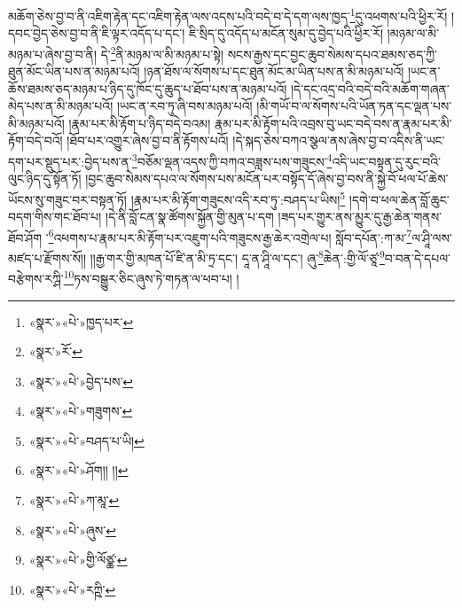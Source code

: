 མཆོག་ཅེས་བྱ་བ་ནི་འཇིག་རྟེན་དང་འཇིག་རྟེན་ལས་འདས་པའི་བདེ་བ་དེ་དག་ལས་ཁྱད་\footnote{«སྣར་»«པེ་»ཁྱད་པར་}དུ་འཕགས་པའི་ཕྱིར་རོ། །དབང་བྱེད་ཅེས་བྱ་བ་ནི་ཇི་ལྟར་འདོད་པ་དང་། ཇི་སྲིད་དུ་འདོད་པ་མངོན་སུམ་དུ་བྱེད་པའི་ཕྱིར་རོ། །མཉམ་ལ་མི་མཉམ་པ་ཞེས་བྱ་བ་ནི། དེ་\footnote{«སྣར་»རོ་}ནི་མཉམ་ལ་མི་མཉམ་པ་སྟེ། སངས་རྒྱས་དང་བྱང་ཆུབ་སེམས་དཔའ་ཐམས་ཅད་ཀྱི་ཐུན་མོང་ཡིན་པས་ན་མཉམ་པའོ། །ཉན་ཐོས་ལ་སོགས་པ་དང་ཐུན་མོང་མ་ཡིན་པས་ན་མི་མཉམ་པའོ། །ཡང་ན་ཆོས་ཐམས་ཅད་མཉམ་པ་ཉིད་དུ་ཁོང་དུ་ཆུད་པ་ཐོབ་པས་ན་མཉམ་པའོ། །དེ་དང་འདྲ་བའི་བདེ་བའི་མཆོག་གཞན་མེད་པས་ན་མི་མཉམ་པའོ། །ཡང་ན་རབ་ཏུ་ཞི་བས་མཉམ་པའོ། །མི་གཡོ་བ་ལ་སོགས་པའི་ཡོན་ཏན་དང་ལྡན་པས་མི་མཉམ་པའོ། །རྣམ་པར་མི་རྟོག་པ་ཉིད་བདེ་བའམ། རྣམ་པར་མི་རྟོག་པའི་འབྲས་བུ་ཡང་བདེ་བས་ན་རྣམ་པར་མི་རྟོག་བདེ་བའོ། །ཐོབ་པར་འགྱུར་ཞེས་བྱ་བ་ནི་རྟོགས་པའོ། །དེ་སྐད་ཅེས་བཀའ་སྩལ་ནས་ཞེས་བྱ་བ་འདིས་ནི་ཡང་དག་པར་སྡུད་པར་:བྱེད་པས་ན་\footnote{«སྣར་»«པེ་»བྱེད་པས་}བཅོམ་ལྡན་འདས་ཀྱི་བཀའ་བཟླས་པས་གཟུངས་\footnote{«སྣར་»«པེ་»གཟུགས་}འདི་ཡང་བསྟན་དུ་རུང་བའི་ལུང་ཉིད་དུ་སྟོན་ཏོ། །བྱང་ཆུབ་སེམས་དཔའ་ལ་སོགས་པས་མངོན་པར་བསྟོད་དོ་ཞེས་བྱ་བས་ནི་སྐྱེ་བོ་ཕལ་པོ་ཆེས་ཡོངས་སུ་གཟུང་བར་བསྟན་ཏོ། །རྣམ་པར་མི་རྟོག་གཟུངས་འདི་རབ་ཏུ་:བཤད་པ་ཡིས།\footnote{«སྣར་»«པེ་»བཤད་པ་ཡི།} །དགེ་བ་ཕལ་ཆེན་བློ་ཆུང་བདག་གིས་གང་ཐོབ་པ། །དེ་ནི་བློ་ངན་སྣ་ཚོགས་སྐྱོན་གྱི་མུན་པ་དག །ཟད་པར་གྱུར་ནས་མྱུར་དུ་རྒྱ་ཆེན་གནས་ཐོབ་ཤོག ་\footnote{«སྣར་»«པེ་»ཤོག།། །།}འཕགས་པ་རྣམ་པར་མི་རྟོག་པར་འཇུག་པའི་གཟུངས་རྒྱ་ཆེར་འགྲེལ་པ། སློབ་དཔོན་:ཀ་མ་\footnote{«སྣར་»«པེ་»ཀ་མཱ་}ལ་ཤཱི་ལས་མཛད་པ་རྫོགས་སོ།། །།རྒྱ་གར་གྱི་མཁན་པོ་ཛི་ན་མི་ཏྲ་དང་། དཱ་ན་ཤཱི་ལ་དང་། ཞུ་\footnote{«སྣར་»«པེ་»ཞུས་}ཆེན་:གྱི་ལོ་ཙཱ་\footnote{«སྣར་»«པེ་»གྱི་ལོཙྪ་}བ་བན་དེ་དཔལ་བརྩེགས་རཀྴི་\footnote{«སྣར་»«པེ་»རཀྵི་}ཏས་བསྒྱུར་ཅིང་ཞུས་ཏེ་གཏན་ལ་ཕབ་པ། ། 